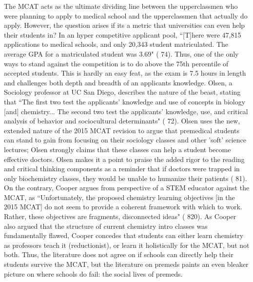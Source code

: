\documentclass [12pt]{article}
\begin{document}
\begin{flushleft}
The MCAT acts as the ultimate dividing line between the upperclassmen who were planning to apply to medical school and the upperclassmen that actually do apply. However, the question arises if its a metric that universities can  even help their students in? In an hyper competitive applicant pool, {``}[T]here were 47,815 applications to medical schools, and only 20,343 student matriculated. The average GPA for a matriculated student was 3.69" (\cite{Olsen-2016} 74). Thus, one of the only ways to stand against the competition is to do above the 75th percentile of accepted students. This is hardly an easy feat, as the exam is 7.5 hours in length and challenges both depth and breadth of an applicants knowledge. Olsen, a Sociology professor at UC San Diego, describes the nature of the beast, stating that {``}The first two test the applicants' knowledge and use of concepts in biology [and] chemistry... The second two test the applicants' knowledge, use, and critical analysis of behavior and sociocultural determinants" (\cite{Olsen-2016} 72). Olsen uses the new, extended nature of the 2015 MCAT revision to argue that premedical students can stand to gain from focusing on their sociology classes and other 'soft' science lectures; Olsen strongly claims that these classes can help a student become effective doctors. Olsen makes it a point to praise the added rigor to the reading and critical thinking components as a reminder that if doctors were trapped in only biochemistry classes, they would be unable to humanize their patients (\cite{Olsen-2016} 81). On the contrary, Cooper argues from perspective of a STEM educator against the MCAT, as {``}Unfortunately, the proposed chemistry learning objectives [in the 2015 MCAT] do not seem to provide a coherent framework with which to work. Rather, these objectives are fragments, disconnected ideas" (\cite{Cooper-2013} 820). As Cooper also argued that the structure of current chemistry intro classes was fundamentally flawed, Cooper concedes that students can either learn chemistry as professors teach it (reductionist), or learn it holistically for the MCAT, but not both. Thus, the literature does not agree on if schools can directly help their students survive the MCAT, but the literature on premeds paints an even bleaker picture on where schools do fail: the social lives of premeds.
	  

\end{flushleft}
\end{document}
